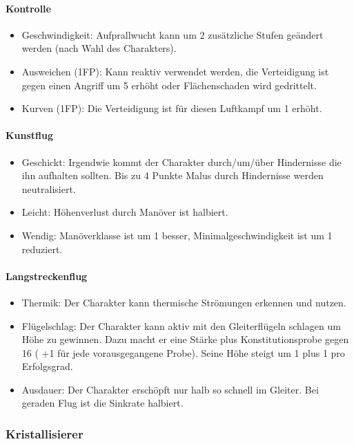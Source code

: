 \documentclass{article}
\begin{document}
\paragraph{Kontrolle}

\begin{itemize}
\item Geschwindigkeit: Aufprallwucht kann um 2 zusätzliche Stufen geändert werden (nach Wahl des Charakters).
\item Ausweichen (1FP): Kann reaktiv verwendet werden, die Verteidigung ist gegen einen Angriff um 5 erhöht oder Flächenschaden wird gedrittelt.
\item Kurven (1FP): Die Verteidigung ist für diesen Luftkampf um 1 erhöht.
\end{itemize}

\paragraph{Kunstflug}

\begin{itemize}
\item Geschickt: Irgendwie kommt der Charakter durch/um/über Hindernisse die ihn aufhalten sollten. Bis zu 4 Punkte Malus durch Hindernisse werden neutralisiert.
\item Leicht: Höhenverlust durch Manöver ist halbiert.
\item Wendig: Manöverklasse ist um 1 besser, Minimalgeschwindigkeit ist um 1 reduziert.
\end{itemize}

\paragraph{Langstreckenflug}

\begin{itemize}
\item Thermik: Der Charakter kann thermische Strömungen erkennen und nutzen.
\item Flügelschlag: Der Charakter kann aktiv mit den Gleiterflügeln schlagen um Höhe zu gewinnen. Dazu macht er eine Stärke plus Konstitutionsprobe gegen 16 ( +1 für jede vorausgegangene Probe). Seine Höhe steigt um 1 plus 1 pro Erfolgsgrad.
\item Ausdauer: Der Charakter erschöpft nur halb so schnell im Gleiter. Bei geraden Flug ist die Sinkrate halbiert.
\end{itemize}

\subsubsection{Kristallisierer}
\end{document}
